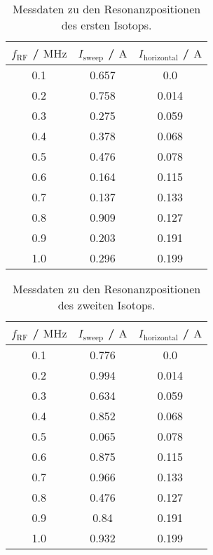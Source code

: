 \begin{table}[H]
    \centering
    \caption{Messdaten zu den Resonanzpositionen des ersten Isotops.}
    \label{tab:DatenIsotop1}
    \begin{tabular}{c c c}
        \toprule
        $f_{\text{RF}}$ / $\si{\mega\hertz}$ & $I_{\text{sweep}}$ / $\si{\ampere}$  & $I_{\text{horizontal}}$ / $\si{\ampere}$ \\
        \midrule
        0.1  &  0.657  &   0.0    \\
        0.2  &  0.758  &   0.014  \\
        0.3  &  0.275  &   0.059  \\
        0.4  &  0.378  &   0.068  \\
        0.5  &  0.476  &   0.078  \\
        0.6  &  0.164  &   0.115  \\
        0.7  &  0.137  &   0.133  \\
        0.8  &  0.909  &   0.127  \\
        0.9  &  0.203  &  0.191   \\
        1.0  &  0.296  &   0.199  \\
        \bottomrule
    \end{tabular}
\end{table}

\begin{table}[H]
    \centering
    \caption{Messdaten zu den Resonanzpositionen des zweiten Isotops.}
    \label{tab:DatenIsotop2}
    \begin{tabular}{c c c}
        \toprule
        $f_{\text{RF}}$ / $\si{\mega\hertz}$ & $I_{\text{sweep}}$ / $\si{\ampere}$  & $I_{\text{horizontal}}$ / $\si{\ampere}$ \\
        \midrule
        0.1  &  0.776  &  0.0  \\
        0.2  &  0.994  &  0.014  \\
        0.3  &  0.634  &  0.059  \\
        0.4  &  0.852  &  0.068  \\
        0.5  &  0.065  &  0.078  \\
        0.6  &  0.875  &  0.115  \\
        0.7  &  0.966  &  0.133  \\
        0.8  &  0.476  &  0.127  \\
        0.9  &  0.84  &  0.191 \\
        1.0  &  0.932  &  0.199  \\
        \bottomrule
    \end{tabular}
\end{table}

